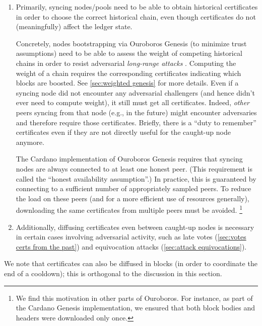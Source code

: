 \begin{enumerate}
\item\label{enumi:cert diffusion:syncing}
  Primarily, syncing nodes/pools need to be able to obtain historical certificates in order to choose the correct historical chain, even though certificates do not (meaningfully) affect the ledger state.

  Concretely, nodes bootstrapping via Ouroboros Genesis (to minimize trust assumptions) need to be able to assess the weight of competing historical chains in order to resist adversarial \emph{long-range attacks} \parencite{genesis-implementation-documentation}.
  Computing the weight of a chain requires the corresponding certificates indicating which blocks are boosted.
  See \cref{sec:weighted genesis} for more details.
  Even if a syncing node did not encounter any adversarial challengers (and hence didn't ever need to compute weight), it still must get all certificates. Indeed, \emph{other} peers syncing from that node (e.g., in the future) might encounter adversaries and therefore require those certificates.
  Briefly, there is a \enquote{duty to remember} certificates even if they are not directly useful for the caught-up node anymore.

  The Cardano implementation of Ouroboros Genesis \parencite{genesis-implementation-documentation} requires that syncing nodes are always connected to at least one honest peer.
  (This requirement is called the \enquote{honest availability assumption}.)
  In practice, this is guaranteed by connecting to a sufficient number of appropriately sampled peers.
  To reduce the load on these peers (and for a more efficient use of resources generally), downloading the same certificates from multiple peers must be avoided.%
%
\footnote{We find this motivation in other parts of Ouroboros. For instance, as part of the Cardano Genesis implementation, we ensured that both block bodies and headers were downloaded only once.\cite{genesis-implementation-documentation}}
\item\label{enumi:cert diffusion:caught up}
  Additionally, diffusing certificates even between caught-up nodes is necessary in certain cases involving adversarial activity, such as late votes (\cref{sec:votes certs from the past}) and equivocation attacks (\cref{sec:attack equivocations}).
\end{enumerate}

We note that certificates can also be diffused in blocks (in order to coordinate the end of a cooldown); this is orthogonal to the discussion in this section.

